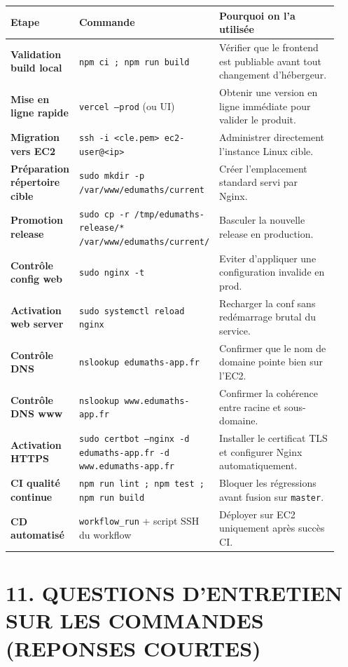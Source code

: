 \documentclass[10pt,a4paper]{article}
\begin{document}
\begin{longtable}{>{\bfseries}p{0.18\linewidth}p{0.33\linewidth}p{0.42\linewidth}}
Etape & Commande & Pourquoi on l'a utilis\'ee \\
\hline
Validation build local & \texttt{npm ci ; npm run build} & V\'erifier que le frontend est publiable avant tout changement d'h\'ebergeur. \\
Mise en ligne rapide & \texttt{vercel --prod} (ou UI) & Obtenir une version en ligne imm\'ediate pour valider le produit. \\
Migration vers EC2 & \texttt{ssh -i <cle.pem> ec2-user@<ip>} & Administrer directement l'instance Linux cible. \\
Pr\'eparation r\'epertoire cible & \texttt{sudo mkdir -p /var/www/edumaths/current} & Cr\'eer l'emplacement standard servi par Nginx. \\
Promotion release & \texttt{sudo cp -r /tmp/edumaths-release/* /var/www/edumaths/current/} & Basculer la nouvelle release en production. \\
Contr\^ole config web & \texttt{sudo nginx -t} & Eviter d'appliquer une configuration invalide en prod. \\
Activation web server & \texttt{sudo systemctl reload nginx} & Recharger la conf sans red\'emarrage brutal du service. \\
Contr\^ole DNS & \texttt{nslookup edumaths-app.fr} & Confirmer que le nom de domaine pointe bien sur l'EC2. \\
Contr\^ole DNS www & \texttt{nslookup www.edumaths-app.fr} & Confirmer la coh\'erence entre racine et sous-domaine. \\
Activation HTTPS & \texttt{sudo certbot --nginx -d edumaths-app.fr -d www.edumaths-app.fr} & Installer le certificat TLS et configurer Nginx automatiquement. \\
CI qualit\'e continue & \texttt{npm run lint ; npm test ; npm run build} & Bloquer les r\'egressions avant fusion sur \texttt{master}. \\
CD automatis\'e & \texttt{workflow\_run} + script SSH du workflow & D\'eployer sur EC2 uniquement apr\`es succ\`es CI. \\
\end{longtable}

\section{11. QUESTIONS D'ENTRETIEN SUR LES COMMANDES (REPONSES COURTES)}
\end{document}
